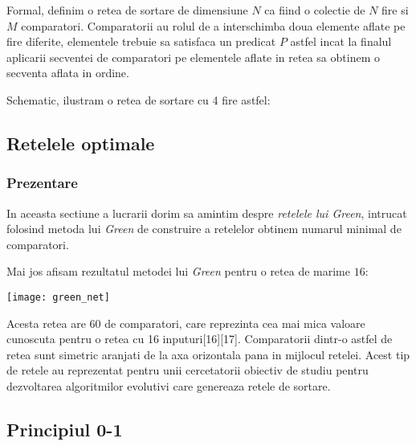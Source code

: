 \documentclass[12pt]{article}
\begin{document}
\noindent Formal, definim o retea de sortare de dimensiune $N$ ca fiind o colectie de $N$ fire si $M$ comparatori. Comparatorii \noindent au rolul de a interschimba doua elemente aflate pe fire diferite, elementele trebuie sa satisfaca un predicat $P$ \noindent astfel incat la finalul aplicarii secventei de comparatori pe elementele aflate in retea sa obtinem o secventa aflata in ordine.

\noindent Schematic, ilustram o retea de sortare cu 4 fire astfel: \break
\begin{center}
\end{center}

\subsection{Retelele optimale}

\subsubsection{Prezentare}
In aceasta sectiune a lucrarii dorim sa amintim despre \textit{retelele lui Green}, intrucat folosind metoda lui \textit{Green} de construire a retelelor obtinem numarul minimal de comparatori.

Mai jos afisam rezultatul metodei lui \textit{Green} pentru o retea de marime $16$:
\begin{center}
\texttt{[image: green\_net]}
\end{center}
Acesta retea are $60$ de comparatori, care reprezinta cea mai mica valoare cunoscuta pentru o retea cu 16 inputuri[16][17]. Comparatorii dintr-o astfel de retea sunt simetric aranjati de la axa orizontala pana in mijlocul retelei. Acest tip de retele au reprezentat pentru unii cercetatorii obiectiv de studiu pentru dezvoltarea algoritmilor evolutivi care genereaza retele de sortare. 

\subsection{Principiul 0-1}
\end{document}
